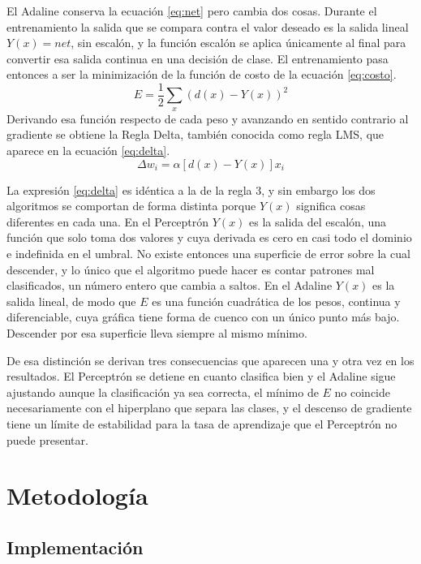 \documentclass[11pt,letterpaper]{article}
\begin{document}
El Adaline conserva la ecuación \eqref{eq:net} pero cambia dos cosas. Durante el entrenamiento la salida que se compara contra el valor deseado es la salida lineal $Y(x) = net$, sin escalón, y la función escalón se aplica únicamente al final para convertir esa salida continua en una decisión de clase. El entrenamiento pasa entonces a ser la minimización de la función de costo de la ecuación \eqref{eq:costo}.
\begin{equation}
    E = \frac{1}{2}\sum_x \left(d(x) - Y(x)\right)^2
    \label{eq:costo}
\end{equation}
Derivando esa función respecto de cada peso y avanzando en sentido contrario al gradiente se obtiene la Regla Delta, también conocida como regla LMS, que aparece en la ecuación \eqref{eq:delta}.
\begin{equation}
    \Delta w_i = \alpha\left[d(x) - Y(x)\right] x_i
    \label{eq:delta}
\end{equation}

La expresión \eqref{eq:delta} es idéntica a la de la regla 3, y sin embargo los dos algoritmos se comportan de forma distinta porque $Y(x)$ significa cosas diferentes en cada una. En el Perceptrón $Y(x)$ es la salida del escalón, una función que solo toma dos valores y cuya derivada es cero en casi todo el dominio e indefinida en el umbral. No existe entonces una superficie de error sobre la cual descender, y lo único que el algoritmo puede hacer es contar patrones mal clasificados, un número entero que cambia a saltos. En el Adaline $Y(x)$ es la salida lineal, de modo que $E$ es una función cuadrática de los pesos, continua y diferenciable, cuya gráfica tiene forma de cuenco con un único punto más bajo. Descender por esa superficie lleva siempre al mismo mínimo.

De esa distinción se derivan tres consecuencias que aparecen una y otra vez en los resultados. El Perceptrón se detiene en cuanto clasifica bien y el Adaline sigue ajustando aunque la clasificación ya sea correcta, el mínimo de $E$ no coincide necesariamente con el hiperplano que separa las clases, y el descenso de gradiente tiene un límite de estabilidad para la tasa de aprendizaje que el Perceptrón no puede presentar.

\section{Metodología}

\subsection{Implementación}
\end{document}
